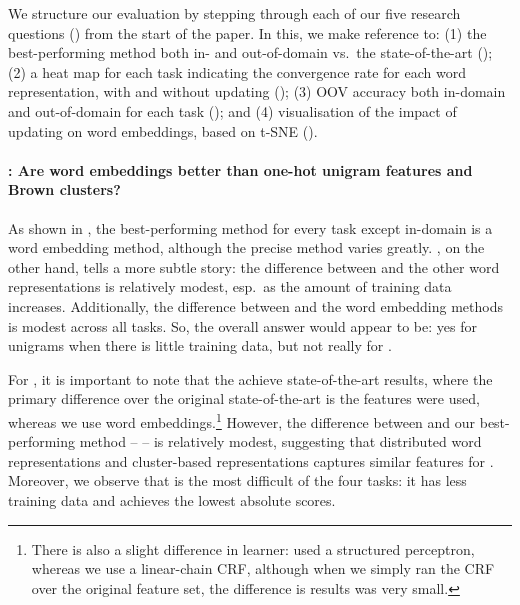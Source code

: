 We structure our evaluation by stepping through each of our five
research questions (\RQ[1--5]) from the start of the paper. In this, we
make reference to: (1) the best-performing method both in- and
out-of-domain vs.\ the state-of-the-art (); (2) a
heat map for each task indicating the convergence rate for each word
representation, with and without updating (); 
(3) OOV accuracy both in-domain and out-of-domain for each task
(); and (4)  visualisation of the impact of
updating on word embeddings, based on t-SNE
().

\paragraph{\RQ[1]: Are word embeddings better than one-hot unigram features
  and Brown clusters?}  As shown in , the
best-performing method for every task except in-domain \chunking is a
word embedding method, although the precise method varies
greatly. , on the other hand, tells a more subtle
story: the difference between \unigram and the other word
representations is relatively modest, esp.\ as the amount of training
data increases. Additionally, the difference between \brown and the word
embedding methods is modest across all tasks. So, the overall answer
would appear to be: yes for unigrams when there is little training data, but not really for \brown.

For \mwe, it is important to note that the achieve state-of-the-art
results, where the primary difference over the original state-of-the-art
is the \brown features were used, whereas we use word
embeddings.\footnote{There is also a slight difference in learner:
   used a structured perceptron, whereas we use
  a linear-chain CRF, although when we simply ran the CRF over the
  original feature set, the difference is results was very small.}
  However, the difference between \brown and our best-performing method
-- \CW[\withup] -- is relatively modest, suggesting that distributed
word representations and cluster-based representations captures similar
features for \mwe. 
Moreover, we observe that \mwe is the most difficult
of the four tasks: it has less training data and achieves the lowest
absolute scores.



